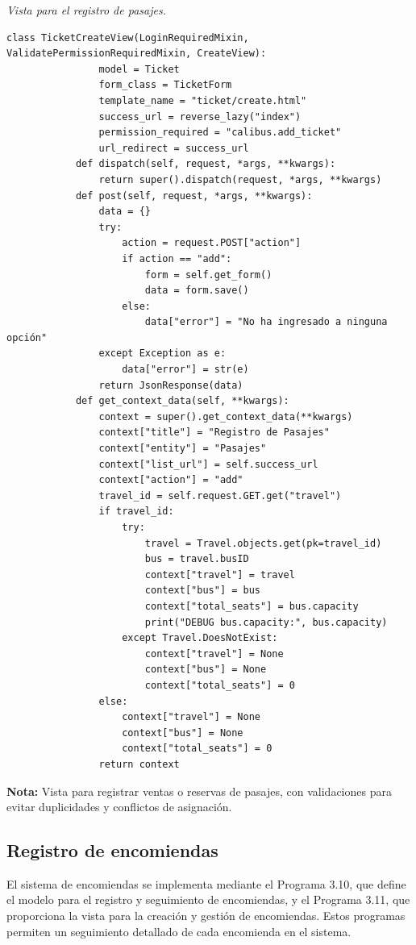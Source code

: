 		\textit{Vista para el registro de pasajes.} %
		\vspace{0.3cm} %
		\begin{lstlisting}[lineskip=-1pt]
			class TicketCreateView(LoginRequiredMixin, ValidatePermissionRequiredMixin, CreateView):
				model = Ticket
				form_class = TicketForm
				template_name = "ticket/create.html"
				success_url = reverse_lazy("index")
				permission_required = "calibus.add_ticket"
				url_redirect = success_url			
			def dispatch(self, request, *args, **kwargs):
				return super().dispatch(request, *args, **kwargs)			
			def post(self, request, *args, **kwargs):
				data = {}
				try:
					action = request.POST["action"]
					if action == "add":
						form = self.get_form()
						data = form.save()
					else:
						data["error"] = "No ha ingresado a ninguna opción"
				except Exception as e:
					data["error"] = str(e)
				return JsonResponse(data)			
			def get_context_data(self, **kwargs):
				context = super().get_context_data(**kwargs)
				context["title"] = "Registro de Pasajes"
				context["entity"] = "Pasajes"
				context["list_url"] = self.success_url
				context["action"] = "add"
				travel_id = self.request.GET.get("travel")
				if travel_id:
					try:
						travel = Travel.objects.get(pk=travel_id)
						bus = travel.busID
						context["travel"] = travel
						context["bus"] = bus
						context["total_seats"] = bus.capacity
						print("DEBUG bus.capacity:", bus.capacity)  
					except Travel.DoesNotExist:
						context["travel"] = None
						context["bus"] = None
						context["total_seats"] = 0
				else:
					context["travel"] = None
					context["bus"] = None
					context["total_seats"] = 0
				return context
		\end{lstlisting}
		
		\textbf{Nota:} Vista para registrar ventas o reservas de pasajes, con validaciones para evitar duplicidades y conflictos de asignación.
			
	\subsection{Registro de encomiendas}
	
		El sistema de encomiendas se implementa mediante el Programa 3.10, que define el modelo para el registro y seguimiento de encomiendas, y el Programa 3.11, que proporciona la vista para la creación y gestión de encomiendas. Estos programas permiten un seguimiento detallado de cada encomienda en el sistema.
		
